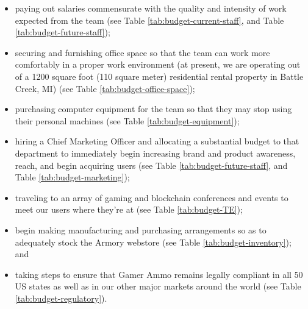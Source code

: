\documentclass[11pt]{report}
\begin{document}
\begin{itemize}
\item paying out salaries commensurate with the quality and intensity of work expected from the team (see Table \ref{tab:budget-current-staff}, and Table \ref{tab:budget-future-staff}); 
\item securing and furnishing office space so that the team can work more comfortably in a proper work environment (at present, we are operating out of a 1200 square foot (110 square meter) residential rental property in Battle Creek, MI) (see Table \ref{tab:budget-office-space}); 
\item purchasing computer equipment for the team so that they may stop using their personal machines (see Table \ref{tab:budget-equipment});
\item hiring a Chief Marketing Officer and allocating a substantial budget to that department to immediately begin increasing brand and product awareness, reach, and begin acquiring users (see Table \ref{tab:budget-future-staff}, and  Table \ref{tab:budget-marketing}); 
\item traveling to an array of gaming and blockchain conferences and events to meet our users where they're at (see Table \ref{tab:budget-TE});
\item begin making manufacturing and purchasing arrangements so as to adequately stock the Armory webstore (see Table \ref{tab:budget-inventory}); and
\item taking steps to ensure that Gamer Ammo remains legally compliant in all 50 US states as well as in our other major markets around the world (see Table \ref{tab:budget-regulatory}).
\end{itemize}
\end{document}

